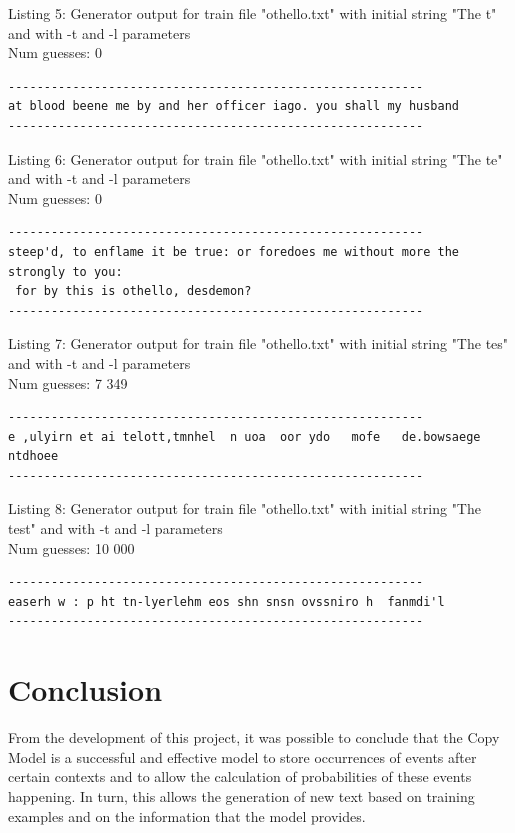 \documentclass{article}
\begin{document}
Listing 5: Generator output for train file "othello.txt" with initial string "The t" and with -t and -l parameters
\\Num guesses: 0

\begin{lstlisting}
----------------------------------------------------------
at blood beene me by and her officer iago. you shall my husband
----------------------------------------------------------
\end{lstlisting}

Listing 6: Generator output for train file "othello.txt" with initial string "The te" and with -t and -l parameters
\\Num guesses: 0

\begin{lstlisting}
----------------------------------------------------------
steep'd, to enflame it be true: or foredoes me without more the strongly to you:
 for by this is othello, desdemon?
----------------------------------------------------------
\end{lstlisting}

Listing 7: Generator output for train file "othello.txt" with initial string "The tes" and with -t and -l parameters
\\Num guesses: 7 349

\begin{lstlisting}
----------------------------------------------------------
e ,ulyirn et ai telott,tmnhel  n uoa  oor ydo   mofe   de.bowsaege ntdhoee 
----------------------------------------------------------
\end{lstlisting}

Listing 8: Generator output for train file "othello.txt" with initial string "The test" and with -t and -l parameters
\\Num guesses: 10 000

\begin{lstlisting}
----------------------------------------------------------
easerh w : p ht tn-lyerlehm eos shn snsn ovssniro h  fanmdi'l
----------------------------------------------------------
\end{lstlisting}

\section{Conclusion}
\label{sec:conclusion}

From the development of this project, it was possible to conclude that the Copy
Model is a successful and effective model to store occurrences of events after certain contexts
and to allow the calculation of probabilities of these events happening. In turn, this allows
the generation of new text based on training examples and on the information that the
model provides.
\end{document}
